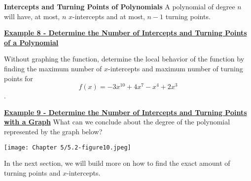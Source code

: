\documentclass[12pt]{book}
\begin{document}
\vspace{150mm}

\begin{boxR}
  \textbf{Intercepts and Turning Points of Polynomials}
  \vspace{1mm}
  \hline
  \vspace{2mm}
  A polynomial of degree $n$ will have, at most, $n$  $x$-intercepts and at most, $n-1$ turning points.
\end{boxR}
\newpage


\underline{\textbf{Example 8 - Determine the Number of Intercepts and Turning Points of a Polynomial}}

Without graphing the function, determine the local behavior of the function by finding the maximum number of $x$-intercepts and  maximum number of turning points for $$f(x)=-3x^{10}+4x^7-x^4+2x^3$$.

\vspace{30mm}

\underline{\textbf{Example 9 - Determine the Number of Intercepts and Turning Points with a Graph}}
What can we conclude about the degree of the polynomial represented by the graph below?
\centerline{\texttt{[image: Chapter 5/5.2-figure10.jpeg]}}


\vspace{50mm}
In the next section, we will build more on how to find the exact amount of turning points and $x$-intercepts.


 
\end{document}
